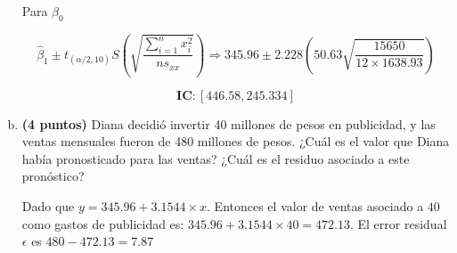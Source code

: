 \documentclass[../main.tex]{subfiles}
\begin{document}
\begin{enumerate}[(a)]
Para $\beta_0$

$$\hat{\beta}_1 \pm t_{(\alpha / 2, 10)}S\left( \sqrt{\frac{\sum_{i = 1}^{n}x_i^2}{ns_{xx}}}\right) \Rightarrow 345.96 \pm 2.228\left(50.63 \sqrt{\frac{15650}{12 \times 1638.93}}\right)$$

$$\textbf{IC} : \left[446.58, 245.334 \right]$$

\item \textbf{(4 puntos)} Diana decidió invertir 40 millones de pesos en publicidad, y las ventas mensuales fueron de 480 millones de pesos. ¿Cuál es el valor que Diana había pronosticado para las ventas? ¿Cuál es el residuo asociado a este pronóstico?

Dado que $y = 345.96 + 3.1544\times x $. Entonces el valor de ventas asociado a $40$ como gastos de publicidad es: $345.96 + 3.1544 \times 40 = 472.13$. El error residual $\epsilon$ es $480 - 472.13 = 7.87$

\end{enumerate}
\end{document}
